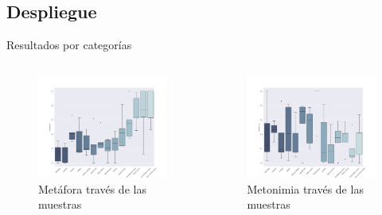 \documentclass[presentation]{beamer}
\begin{document}
\subsection{Despliegue}
\label{sec:org9fca561}
\begin{frame}[label={sec:org55934fb}]{Resultados por categorías}
\begin{columns}
\begin{column}{0.48\columnwidth}
\begin{figure}[H]
\centering
\includegraphics[width=\linewidth]{./resultados/graphs/total/accum_cat_metafora.png}

\caption{Metáfora través de las muestras }
\end{figure}
\end{column}

\begin{column}{0.48\columnwidth}
\begin{figure}[H]
\includegraphics[width=\linewidth]{./resultados/graphs/total/accum_cat_metonimia.png}
\caption{Metonimia través de las muestras }
\centering

\end{figure}
\end{column}
\end{columns}
\end{frame}
\end{document}
